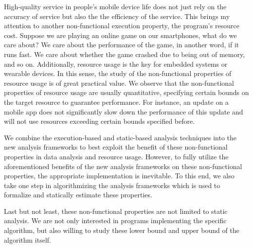 High-quality
service in people's mobile device life does not just rely on the accuracy of service but also the
 the efficiency of the service. 
This brings my attention to another non-functional execution property, the program's resource cost.
Suppose we are playing an online game on our smartphones, what do we care about? We care about the performance of the game, in another word, if it runs fast. We care about whether the game crashed due to being out of memory, and so on. Additionally, resource usage is the key for embedded systems or wearable devices. In this sense, the study of the non-functional properties of resource usage is of great practical value. We observe that the non-functional properties of resource usage are usually quantitative, specifying certain bounds on the target resource to guarantee performance. For instance, an update on a mobile app does not significantly slow down the performance of this update and will not use resources exceeding certain bounds specified before.


We combine the
execution-based and static-based
analysis techniques into the new
analysis frameworks to best exploit the benefit of these non-functional properties in data analysis and resource usage. However, to fully utilize the aforementioned benefits of the new analysis frameworks on these non-functional properties, the appropriate implementation is inevitable. 
To this end, we also take one step in algorithmizing the analysis frameworks
which is used to formalize and statically estimate these properties.

Last but not least, these non-functional properties are not limited to static analysis. We are not only interested in programs implementing the specific algorithm, but also willing to study these lower bound and upper bound of the algorithm itself.

